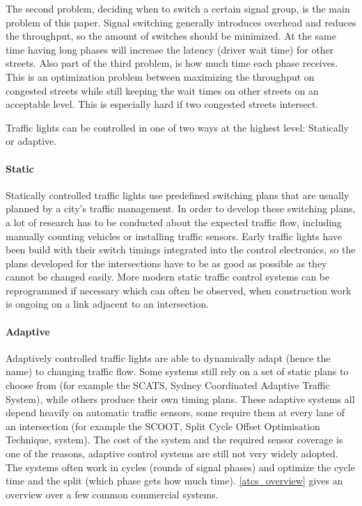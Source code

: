 The second problem, deciding when to switch a certain signal group, is the main problem of this paper. Signal switching generally introduces overhead and reduces the throughput, so the amount of switches should be minimized. At the same time having long phases will increase the latency (driver wait time) for other streets. Also part of the third problem, is how much time each phase receives. This is an optimization problem between maximizing the throughput on congested streets while still keeping the wait times on other streets on an acceptable level. This is especially hard if two congested streets intersect.

Traffic lights can be controlled in one of two ways at the highest level: Statically or adaptive.

\paragraph{Static} Statically controlled traffic lights use predefined switching plans that are usually planned by a city's traffic management. In order to develop these switching plans, a lot of research has to be conducted about the expected traffic flow, including manually counting vehicles or installing traffic sensors. Early traffic lights have been build with their switch timings integrated into the control electronics, so the plans developed for the intersections have to be as good as possible as they cannot be changed easily. More modern static traffic control systems can be reprogrammed if necessary which can often be observed, when construction work is ongoing on a link adjacent to an intersection.

\paragraph{Adaptive} Adaptively controlled traffic lights are able to dynamically adapt (hence the name) to changing traffic flow. Some systems still rely on a set of static plans to choose from (for example the SCATS, Sydney Coordinated Adaptive Traffic System), while others produce their own timing plans. These adaptive systems all depend heavily on automatic traffic sensors, some require them at every lane of an intersection (for example the SCOOT, Split Cycle Offset Optimisation Technique, system). The cost of the system and the required sensor coverage is one of the reasons, adaptive control systems are still not very widely adopted. The systems often work in cycles (rounds of signal phases) and optimize the cycle time and the split (which phase gets how much time). \autoref{atcs_overview} gives an overview over a few common commercial systems. \cite{atcs_overview}

